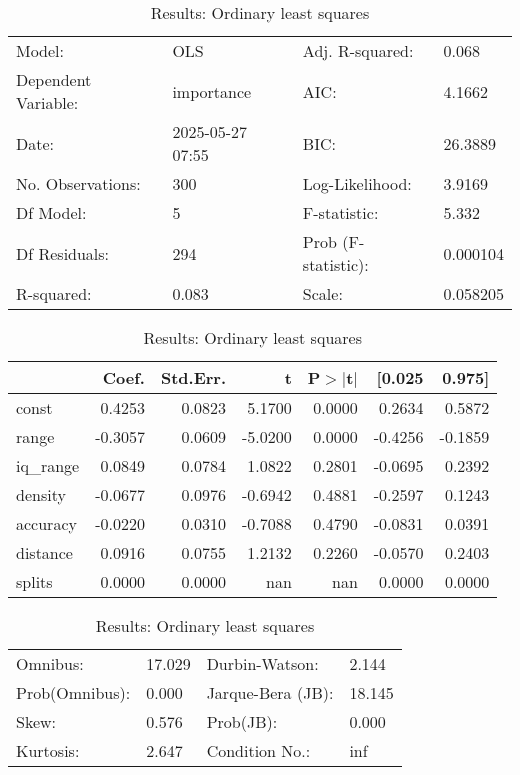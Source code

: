 \begin{table}
\caption{Results: Ordinary least squares}
\label{}
\begin{center}
\begin{tabular}{llll}
\hline
Model:              & OLS              & Adj. R-squared:     & 0.068     \\
Dependent Variable: & importance       & AIC:                & 4.1662    \\
Date:               & 2025-05-27 07:55 & BIC:                & 26.3889   \\
No. Observations:   & 300              & Log-Likelihood:     & 3.9169    \\
Df Model:           & 5                & F-statistic:        & 5.332     \\
Df Residuals:       & 294              & Prob (F-statistic): & 0.000104  \\
R-squared:          & 0.083            & Scale:              & 0.058205  \\
\hline
\end{tabular}
\end{center}

\begin{center}
\begin{tabular}{lrrrrrr}
\hline
          &   Coef. & Std.Err. &       t & P$> |$t$|$ &  [0.025 &  0.975]  \\
\hline
const     &  0.4253 &   0.0823 &  5.1700 &      0.0000 &  0.2634 &  0.5872  \\
range     & -0.3057 &   0.0609 & -5.0200 &      0.0000 & -0.4256 & -0.1859  \\
iq\_range &  0.0849 &   0.0784 &  1.0822 &      0.2801 & -0.0695 &  0.2392  \\
density   & -0.0677 &   0.0976 & -0.6942 &      0.4881 & -0.2597 &  0.1243  \\
accuracy  & -0.0220 &   0.0310 & -0.7088 &      0.4790 & -0.0831 &  0.0391  \\
distance  &  0.0916 &   0.0755 &  1.2132 &      0.2260 & -0.0570 &  0.2403  \\
splits    &  0.0000 &   0.0000 &     nan &         nan &  0.0000 &  0.0000  \\
\hline
\end{tabular}
\end{center}

\begin{center}
\begin{tabular}{llll}
\hline
Omnibus:       & 17.029 & Durbin-Watson:    & 2.144   \\
Prob(Omnibus): & 0.000  & Jarque-Bera (JB): & 18.145  \\
Skew:          & 0.576  & Prob(JB):         & 0.000   \\
Kurtosis:      & 2.647  & Condition No.:    & inf     \\
\hline
\end{tabular}
\end{center}
\end{table}
